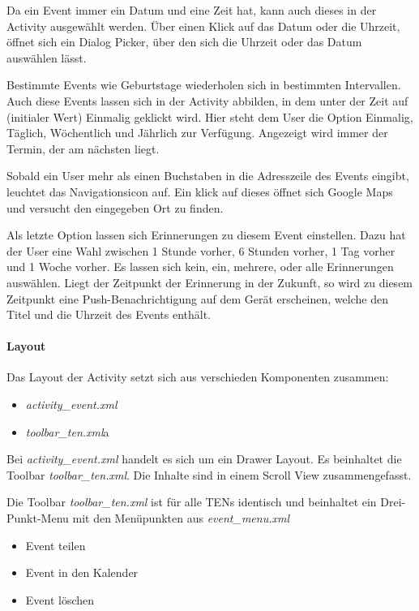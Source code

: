 Da ein Event immer ein Datum und eine Zeit hat, kann auch dieses in der Activity ausgewählt werden. Über einen Klick auf das Datum oder die Uhrzeit, öffnet sich ein Dialog Picker, über den sich die Uhrzeit oder das Datum auswählen lässt.

Bestimmte Events wie Geburtstage wiederholen sich in bestimmten Intervallen. Auch diese Events lassen sich in der Activity abbilden, in dem unter der Zeit auf (initialer Wert) Einmalig geklickt wird. Hier steht dem User die Option Einmalig, Täglich, Wöchentlich und Jährlich zur Verfügung. Angezeigt wird immer der Termin, der am nächsten liegt.

Sobald ein User mehr als einen Buchstaben in die Adresszeile des Events eingibt, leuchtet das Navigationsicon auf. Ein klick auf dieses öffnet sich Google Maps und versucht den eingegeben Ort zu finden.

Als letzte Option lassen sich Erinnerungen zu diesem Event einstellen. Dazu hat der User eine Wahl zwischen 1 Stunde vorher, 6 Stunden vorher, 1 Tag vorher und 1 Woche vorher. Es lassen sich kein, ein, mehrere, oder alle Erinnerungen auswählen. Liegt der Zeitpunkt der Erinnerung in der Zukunft, so wird zu diesem Zeitpunkt eine Push-Benachrichtigung auf dem Gerät erscheinen, welche den Titel und die Uhrzeit des Events enthält.

\paragraph{Layout}

Das Layout der Activity setzt sich aus verschieden Komponenten zusammen:
\begin{itemize}
\item \textit{activity\_event.xml}
\item \textit{toolbar\_ten.xml}a
\end{itemize}
Bei \textit{activity\_event.xml} handelt es sich um ein Drawer Layout. Es beinhaltet die Toolbar \textit{toolbar\_ten.xml}. Die Inhalte sind in einem Scroll View zusammengefasst.

Die Toolbar \textit{toolbar\_ten.xml} ist für alle TENs identisch und beinhaltet ein Drei-Punkt-Menu mit den Menüpunkten aus \textit{event\_menu.xml}
\begin{itemize}
\item Event teilen
\item Event in den Kalender
\item Event löschen
\end{itemize}

